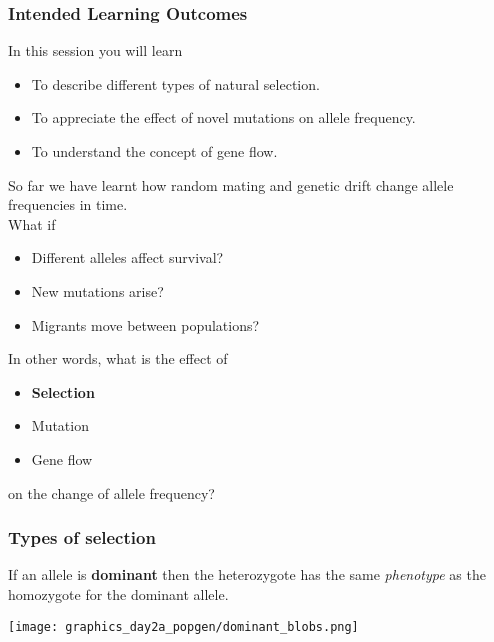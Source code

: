 \documentclass{beamer}
\newcommand{\1}{\ensuremath{\mathbf{1}}}
\begin{document}
\begin{frame}\frametitle{Intended Learning Outcomes}
	In this session you will learn
	\begin{itemize}
		\item To describe different types of natural selection.
		\item To appreciate the effect of novel mutations on allele frequency.
		\item To understand the concept of gene flow.
	\end{itemize}
\end{frame}
%
%
%
\begin{frame}
	So far we have learnt how random mating and genetic drift change allele frequencies in time.\\
	What if
	\begin{itemize}
		\item Different alleles affect survival?
		\item New mutations arise?
		\item Migrants move between populations?
	\end{itemize}
\end{frame}
%
%
%
\begin{frame}
	In other words, what is the effect of
	\begin{itemize}
		\item \textbf{Selection}
		\item Mutation
		\item Gene flow
	\end{itemize}
	on the change of allele frequency?
\end{frame}
%
%
%
\begin{frame}\frametitle{Types of selection}
	If an allele is \textbf{dominant} then the heterozygote has the same \emph{phenotype} as the homozygote for the dominant allele.
	\begin{center}
		\texttt{[image: graphics\_day2a\_popgen/dominant\_blobs.png]}
	\end{center}
\end{frame}
\end{document}
